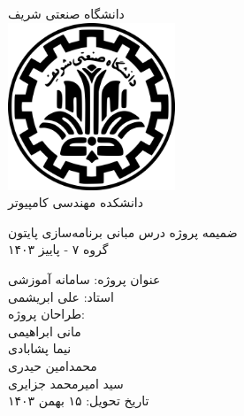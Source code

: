 \thispagestyle{empty}
\begin{center}
    {دانشگاه صنعتی شریف}\\
    \vspace{8mm}
    \includegraphics[width=5cm]{images/sharif.png}\\
    \vspace{12mm}
    {\large دانشکده مهندسی کامپیوتر}\\
    \vspace{16mm}

    {\huge ضمیمه پروژه درس مبانی برنامه‌سازی پایتون}\\
    \vspace{5mm}
    {\Large گروه ۷ - پاییز ۱۴۰۳}\\
    \vspace{5mm}

    {\Large عنوان پروژه: سامانه آموزشی }\\

    \vspace{12mm}
    {\Large استاد: علی ابریشمی}\\
    \vspace{20mm}
    {\large طراحان پروژه: }\\
    \vspace{4mm}
    {\large مانی ابراهیمی}\\
    {\large نیما پشابادی}\\
    {\large محمدامین حیدری}\\
    {\large سید امیرمحمد جزایری}\\

    \vspace{20mm}
    {\Large تاریخ تحویل: ۱۵ بهمن ۱۴۰۳}\\
\end{center}